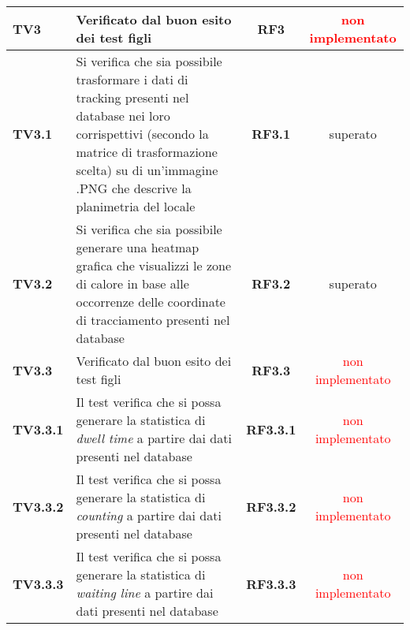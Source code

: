 \begin{center}
\begin{longtable}{ | l | p{5cm} | c | c |}
\textbf{TV3} & Verificato dal buon esito dei test figli & \textbf{RF3} &  \textcolor{red}{non implementato}  \\ \hline 
\textbf{TV3.1} & Si verifica che sia possibile trasformare i dati di tracking presenti nel database nei loro corrispettivi (secondo la matrice di trasformazione scelta) su di un'immagine .PNG che descrive la planimetria del locale & \textbf{RF3.1} &  \textcolor{green!80!blue}{superato}  \\ \hline 
\textbf{TV3.2} & Si verifica che sia possibile generare una heatmap grafica che visualizzi le zone di calore in base alle occorrenze delle coordinate di tracciamento presenti nel database & \textbf{RF3.2} &  \textcolor{green!80!blue}{superato}  \\ \hline 
\textbf{TV3.3} & Verificato dal buon esito dei test figli & \textbf{RF3.3} &  \textcolor{red}{non implementato}  \\ \hline 
\textbf{TV3.3.1} & Il test verifica che si possa generare la statistica di \textit{dwell time} a partire dai dati presenti nel database & \textbf{RF3.3.1} &  \textcolor{red}{non implementato}  \\ \hline 
\textbf{TV3.3.2} & Il test verifica che si possa generare la statistica di \textit{counting} a partire dai dati presenti nel database & \textbf{RF3.3.2} &  \textcolor{red}{non implementato}  \\ \hline 
\textbf{TV3.3.3} & Il test verifica che si possa generare la statistica di \textit{waiting line} a partire dai dati presenti nel database & \textbf{RF3.3.3} &  \textcolor{red}{non implementato}  \\ \hline 
\end{longtable}
\end{center}

